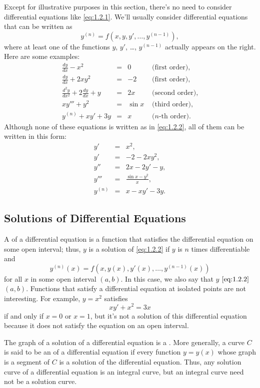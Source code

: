\documentclass{ximera}
\begin{document}
Except for illustrative purposes in this section, there's no need to
consider differential equations like \eqref{eq:1.2.1}.  We'll
usually consider differential equations that can be written as
\begin{equation} \label{eq:1.2.2}
y^{(n)}=f(x,y,y', \dots,y^{(n-1)}),
\end{equation}
where at least one of the functions $y$, $y'$, \dots, $y^{(n-1)}$ actually
appears on the right. Here are some examples:
$$
\begin{array}{rcll}
\frac{dy}{dx}-x^2&=&0&\mbox{ (first order)},  \\
\frac{dy}{dx}+2xy^2&=&-2&\mbox{ (first order)},   \\
\frac{d^2y}{dx^2}+2\frac{dy}{dx}+y&=&2x&\mbox{ (second order)},
\\
xy'''+y^2&=&\sin x  &\mbox{ (third order)},
\\
y^{(n)}+xy'+3y&=&x&\mbox{ ($n$-th order)}.
\end{array}
$$
Although none of these equations is  written as in
\eqref{eq:1.2.2}, all of them can be written in this form:
$$
\begin{array}{rcl}
y'&=&x^2,  \\
y'&=&-2-2xy^2,   \\
y''&=&2x-2y'-y,  \\
y'''&=&\frac{\sin x-y^2}{x},
\\ y^{(n)}&=&x-xy'-3y.
\end{array}
$$

\subsection*{Solutions of Differential Equations}

A  of a differential equation is a function that
satisfies the differential equation on some open interval;   thus, $y$
is a solution of \eqref{eq:1.2.2} if $y$ is $n$ times differentiable and
$$
y^{(n)}(x)=f(x,y(x),y'(x), \dots,y^{(n-1)}(x))
$$
for all $x$ in some open interval $(a,b)$. In this case, we also say
that $y$  $\eqref{eq:1.2.2}$  $(a,b)$. Functions
that satisfy a differential equation at isolated points are not
interesting. For example, $y=x^2$ satisfies
$$
xy'+x^2=3x
$$
if and only if $x=0$ or $x=1$, but it's not a solution of this
differential equation because it does not satisfy the equation on an
open interval.

The graph of a solution of a differential equation is  a . More generally, a curve $C$ is said to be an  of a differential equation if every function
$y=y(x)$ whose graph is a segment of $C$ is a solution of the
differential equation. Thus, any solution curve of a differential
equation is an integral curve, but an integral curve need not be a
solution curve.
\end{document}
